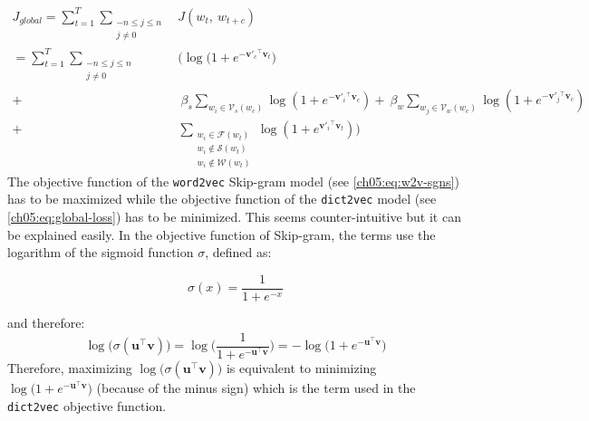     \begin{equation}
      \label{ch05:eq:global-loss}
      \begin{split}
        J_{global} = \sum_{t=1}^T \sum_{\substack{-n \leq j \leq n \\ j \neq 0}} &
               J(w_t,~w_{t+c})\\
          = \sum_{t=1}^T \sum_{\substack{-n \leq j \leq n \\ j \neq 0}} &
          \Big(
          \log \big( 1 + e^{-\mathbf{v'}_{c} {}^\top \mathbf{v}_{t}} \big)\\%
          + &~\beta_{s} \sum_{w_i \in \mathcal{V}_s(w_c)}      %
            \log(1 + e^{-\mathbf{v'}_{i} {}^\top \mathbf{v}_{c}})
          + ~\beta_{w} \sum_{w_j \in \mathcal{V}_w(w_c)}      %
            \log(1 + e^{-\mathbf{v'}_{j} {}^\top \mathbf{v}_{c}}) \\
          + & \sum_{\substack{
            w_i \in \mathcal{F}(w_t) \\
            w_i \notin \mathcal{S}(w_t) \\
            w_i \notin \mathcal{W}(w_t)}}
            \log(1 + e^{\mathbf{v'}_{i} {}^\top \mathbf{v}_{t}})
          \Big)
      \end{split}
    \end{equation}
    The objective function of the \texttt{word2vec} Skip-gram model (see
    \autoref{ch05:eq:w2v-sgns}) has to be maximized while the objective function
    of the \texttt{dict2vec} model (see \autoref{ch05:eq:global-loss}) has to be
    minimized. This seems counter-intuitive but it can be explained easily. In
    the objective function of Skip-gram, the terms use the logarithm of the
    sigmoid function $\sigma$, defined as:

    \begin{equation*}
    \label{ch05:eq:sigmoid}
      \sigma(x) = \frac{1}{1 + e^{-x}}
    \end{equation*}

    \noindent and therefore:
    \begin{equation*}
      \log \big( \sigma(\mathbf{u} {}^\top \mathbf{v}) \big) =
      \log \Big( \frac{1}{1 + e^{-\mathbf{u} {}^\top \mathbf{v}}} \Big) =
      - \log \big(1 + e^{-\mathbf{u} {}^\top \mathbf{v}} \big)
    \end{equation*}
    Therefore, maximizing $\log \big( \sigma(\mathbf{u}{}^\top \mathbf{v})
    \big)$ is equivalent to minimizing $\log \big( 1 + e^{-\mathbf{u} {}^\top
    \mathbf{v}} \big)$ (because of the minus sign) which is the term used in the
    \texttt{dict2vec} objective function.


